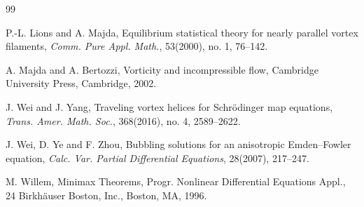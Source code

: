 \documentclass[12pt,reqno]{amsart}
\numberwithin{equation}{section}
\theoremstyle{definition}
\theoremstyle{remark}
\begin{document}
\begin{thebibliography}{99}



P.-L. Lions  and A. Majda, Equilibrium statistical theory for nearly parallel vortex filaments, \textit{Comm. Pure Appl. Math.}, 53(2000), no. 1, 76--142.


A. Majda and A. Bertozzi, Vorticity and incompressible flow, Cambridge University Press, Cambridge, 2002.











J. Wei and J. Yang, Traveling vortex helices for Schr\"odinger map equations, \textit{Trans. Amer. Math. Soc.}, 368(2016), no. 4, 2589--2622.

J. Wei, D. Ye and F. Zhou, Bubbling solutions for an anisotropic Emden–Fowler equation, \textit{Calc. Var. Partial Differential Equations}, 28(2007), 217--247.

M. Willem, Minimax Theorems, Progr. Nonlinear Differential Equations Appl., 24
Birkhäuser Boston, Inc., Boston, MA, 1996. 
 





\end{thebibliography}
\end{document}
